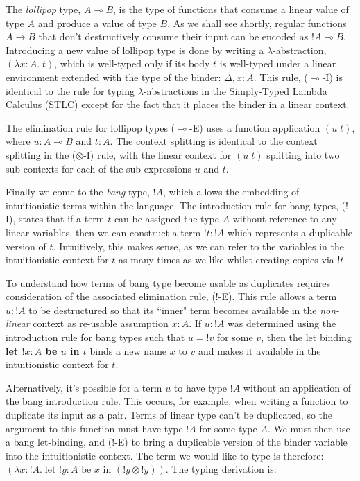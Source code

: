 \documentclass[]{unswthesis}
\newcommand{\lolly}{\multimap}
\let\i\textit
\let\b\textbf
\let\t\text
\begin{document}
The \i{lollipop} type, $A \lolly B$, is the type of functions that consume a linear value of type $A$ and produce a value of type $B$. As we shall see shortly, regular functions $A \to B$ that don't destructively consume their input can be encoded as $!A \lolly B$. Introducing a new value of lollipop type is done by writing a $\lambda$-abstraction, $(\lambda x : A. \; t)$, which is well-typed only if its body $t$ is well-typed under a linear environment extended with the type of the binder: $\Delta, x : A$. This rule, ($\lolly$-I) is identical to the rule for typing $\lambda$-abstractions in the Simply-Typed Lambda Calculus (STLC) except for the fact that it places the binder in a linear context.

The elimination rule for lollipop types ($\lolly$-E) uses a function application $(u \; t)$, where $u : A \lolly B$ and $t : A$. The context splitting is identical to the context splitting in the ($\otimes$-I) rule, with the linear context for $(u \; t)$ splitting into two sub-contexts for each of the sub-expressions $u$ and $t$.

Finally we come to the \i{bang} type, $!A$, which allows the embedding of intuitionistic terms within the language. The introduction rule for bang types, (!-I), states that if a term $t$ can be assigned the type $A$ without reference to any linear variables, then we can construct a term ${!t} : {!A}$ which represents a duplicable version of $t$. Intuitively, this makes sense, as we can refer to the variables in the intuitionistic context for $t$ as many times as we like whilst creating copies via $!t$.

To understand how terms of bang type become usable as duplicates requires consideration of the associated elimination rule, (!-E). This rule allows a term $u : {!A}$ to be destructured so that its ``inner" term becomes available in the \i{non-linear} context as re-usable assumption $x : A$. If $u : {!A}$ was determined using the introduction rule for bang types such that $u = {!v}$ for some $v$, then the let binding \b{let $!x : A$ be $u$ in $t$} binds a new name $x$ to $v$ and makes it available in the intuitionistic context for $t$.

Alternatively, it's possible for a term $u$ to have type $!A$ without an application of the bang introduction rule. This occurs, for example, when writing a function to duplicate its input as a pair. Terms of linear type can't be duplicated, so the argument to this function must have type $!A$ for some type $A$. We must then use a bang let-binding, and (!-E) to bring a duplicable version of the binder variable into the intuitionistic context. The term we would like to type is therefore: $(\lambda x : {!A}. \; \t{let } {!y} : A \t{ be } x \t{ in } ({!y} \otimes {!y}))$. The typing derivation is:
\end{document}

